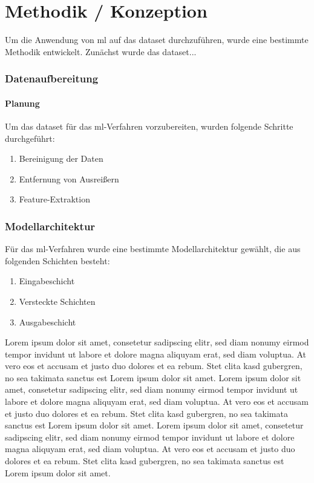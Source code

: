 \documentclass[9pt,a4paper,ngerman]{extarticle}
\begin{document}
\part{Methodik / Konzeption}\label{sec:methodik}
Um die Anwendung von \gls{ml} auf das \gls{dataset} durchzuführen, wurde eine bestimmte Methodik entwickelt. Zunächst wurde das \gls{dataset}...

\section{Datenaufbereitung}\label{subsec:datenaufbereitung}

\subsection{Planung}
Um das \gls{dataset} für das \gls{ml}-Verfahren vorzubereiten, wurden folgende Schritte durchgeführt:

\begin{enumerate}
    \item Bereinigung der Daten
    \item Entfernung von Ausreißern
    \item Feature-Extraktion
\end{enumerate}

\section{Modellarchitektur}\label{subsec:modellarchitektur}
Für das \gls{ml}-Verfahren wurde eine bestimmte Modellarchitektur gewählt, die aus folgenden Schichten besteht\cite{wilson2021}:

\begin{enumerate}
    \item Eingabeschicht
    \item Versteckte Schichten
    \item Ausgabeschicht
\end{enumerate}

Lorem ipsum dolor sit amet, consetetur sadipscing elitr, sed diam nonumy eirmod tempor invidunt ut labore et dolore magna aliquyam erat, sed diam voluptua. At vero eos et accusam et justo duo dolores et ea rebum. Stet clita kasd gubergren, no sea takimata sanctus est Lorem ipsum dolor sit amet. Lorem ipsum dolor sit amet, consetetur sadipscing elitr, sed diam nonumy eirmod tempor invidunt ut labore et dolore magna aliquyam erat, sed diam voluptua. At vero eos et accusam et justo duo dolores et ea rebum. Stet clita kasd gubergren, no sea takimata sanctus est Lorem ipsum dolor sit amet. Lorem ipsum dolor sit amet, consetetur sadipscing elitr, sed diam nonumy eirmod tempor invidunt ut labore et dolore magna aliquyam erat, sed diam voluptua. At vero eos et accusam et justo duo dolores et ea rebum. Stet clita kasd gubergren, no sea takimata sanctus est Lorem ipsum dolor sit amet.   
\end{document}
